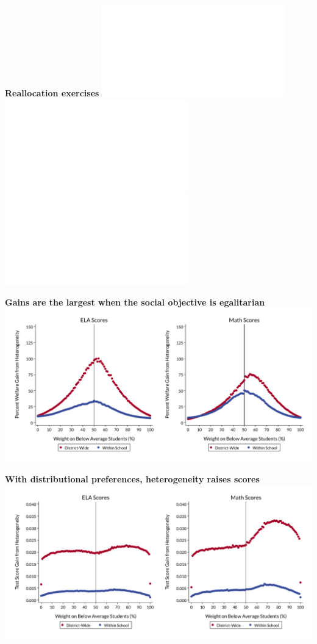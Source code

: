 \documentclass[t,aspectratio=169,11pt,presentation]{beamer}
\begin{document}
\begin{frame}[c,label=versus]{\textbf{Reallocation exercises}}
\centering
 \includegraphics<1>[width=.95\textwidth]{Working_Slides/WS_Figures/03a_reallocation.pdf}%
 \includegraphics<2>[width=.95\textwidth]{Working_Slides/WS_Figures/03e_reallocation.pdf}%
 \includegraphics<3>[width=.95\textwidth]{Working_Slides/WS_Figures/03d_reallocation.pdf}%
 \raggedright
 \vfill
 \hyperlink{equity1}{}
\end{frame}


\begin{frame}[c,label=dist_gains]{\textbf{Gains are the largest when the social objective is egalitarian}}
\centering
 \includegraphics[width=.95\textwidth]{Working_Slides/WS_Figures/03f_reallocation.pdf}
\raggedright
 \vfill
 \hyperlink{equity2}{}
\end{frame}


\begin{frame}[c,label=scores]{\textbf{With distributional preferences, heterogeneity raises scores}}
\centering
 \includegraphics[width=.95\textwidth]{Working_Slides/WS_Figures/03g_reallocation.pdf}%
\raggedright
 \vfill
 \hyperlink{equity2}{}
\end{frame}
\end{document}
